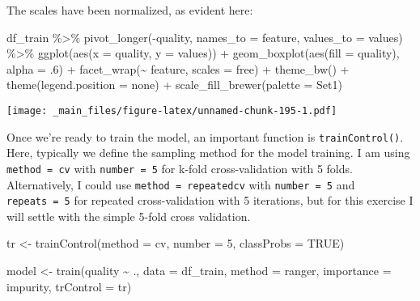 \documentclass[
]{book}
\newenvironment{Shaded}{\begin{snugshade}}{\end{snugshade}}
\newcommand{\AttributeTok}[1]{\textcolor[rgb]{0.77,0.63,0.00}{#1}}
\newcommand{\ConstantTok}[1]{\textcolor[rgb]{0.00,0.00,0.00}{#1}}
\newcommand{\DecValTok}[1]{\textcolor[rgb]{0.00,0.00,0.81}{#1}}
\newcommand{\FunctionTok}[1]{\textcolor[rgb]{0.00,0.00,0.00}{#1}}
\newcommand{\NormalTok}[1]{#1}
\newcommand{\OtherTok}[1]{\textcolor[rgb]{0.56,0.35,0.01}{#1}}
\newcommand{\SpecialCharTok}[1]{\textcolor[rgb]{0.00,0.00,0.00}{#1}}
\newcommand{\StringTok}[1]{\textcolor[rgb]{0.31,0.60,0.02}{#1}}
\begin{document}
The scales have been normalized, as evident here:

\begin{Shaded}
\begin{Highlighting}[]
\NormalTok{df\_train }\SpecialCharTok{\%\textgreater{}\%} \FunctionTok{pivot\_longer}\NormalTok{(}\SpecialCharTok{{-}}\NormalTok{quality, }\AttributeTok{names\_to =} \StringTok{\textquotesingle{}feature\textquotesingle{}}\NormalTok{,}
                          \AttributeTok{values\_to =} \StringTok{\textquotesingle{}values\textquotesingle{}}\NormalTok{) }\SpecialCharTok{\%\textgreater{}\%}
  \FunctionTok{ggplot}\NormalTok{(}\FunctionTok{aes}\NormalTok{(}\AttributeTok{x =}\NormalTok{ quality, }\AttributeTok{y =}\NormalTok{ values)) }\SpecialCharTok{+}
  \FunctionTok{geom\_boxplot}\NormalTok{(}\FunctionTok{aes}\NormalTok{(}\AttributeTok{fill =}\NormalTok{ quality), }\AttributeTok{alpha =}\NormalTok{ .}\DecValTok{6}\NormalTok{) }\SpecialCharTok{+}
  \FunctionTok{facet\_wrap}\NormalTok{(}\SpecialCharTok{\textasciitilde{}}\NormalTok{ feature, }\AttributeTok{scales =} \StringTok{\textquotesingle{}free\textquotesingle{}}\NormalTok{) }\SpecialCharTok{+} \FunctionTok{theme\_bw}\NormalTok{() }\SpecialCharTok{+}
  \FunctionTok{theme}\NormalTok{(}\AttributeTok{legend.position =} \StringTok{\textquotesingle{}none\textquotesingle{}}\NormalTok{) }\SpecialCharTok{+} 
  \FunctionTok{scale\_fill\_brewer}\NormalTok{(}\AttributeTok{palette =} \StringTok{\textquotesingle{}Set1\textquotesingle{}}\NormalTok{)}
\end{Highlighting}
\end{Shaded}

\texttt{[image: \_main\_files/figure-latex/unnamed-chunk-195-1.pdf]}

Once we're ready to train the model, an important function is \texttt{trainControl()}. Here, typically we define the sampling method for the model training. I am using \texttt{method\ =\ cv} with \texttt{number\ =\ 5} for k-fold cross-validation with 5 folds. Alternatively, I could use \texttt{method\ =\ repeatedcv} with \texttt{number\ =\ 5} and \texttt{repeats\ =\ 5} for repeated cross-validation with 5 iterations, but for this exercise I will settle with the simple 5-fold cross validation.

\begin{Shaded}
\begin{Highlighting}[]
\NormalTok{tr }\OtherTok{\textless{}{-}} \FunctionTok{trainControl}\NormalTok{(}\AttributeTok{method =} \StringTok{\textquotesingle{}cv\textquotesingle{}}\NormalTok{,}
                   \AttributeTok{number =} \DecValTok{5}\NormalTok{,}
                   \AttributeTok{classProbs =} \ConstantTok{TRUE}\NormalTok{)}

\NormalTok{model }\OtherTok{\textless{}{-}} \FunctionTok{train}\NormalTok{(quality }\SpecialCharTok{\textasciitilde{}}\NormalTok{ ., }\AttributeTok{data =}\NormalTok{ df\_train,}
               \AttributeTok{method =} \StringTok{\textquotesingle{}ranger\textquotesingle{}}\NormalTok{, }\AttributeTok{importance =} \StringTok{\textquotesingle{}impurity\textquotesingle{}}\NormalTok{,}
               \AttributeTok{trControl =}\NormalTok{ tr)}
\end{Highlighting}
\end{Shaded}
\end{document}
